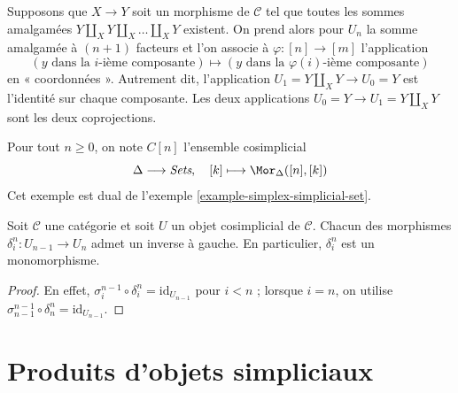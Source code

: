 \begin{example}
\label{example-push-outs-simplicial-object}
Supposons que $X\to Y$ soit un morphisme de $\mathcal{C}$ tel que toutes les
sommes amalgamées $Y\amalg_X Y \amalg_X \ldots \amalg_X Y$ existent.
On prend alors pour $U_n$ la somme amalgamée à $(n + 1)$ facteurs et
l'on associe à $\varphi : [n] \to [m]$ l'application
$$
(y \text{ dans la }i\text{-ième composante})
\mapsto
(y \text{ dans la }\varphi(i)\text{-ième composante})
$$
en « coordonnées ». Autrement dit, l'application
$U_1 = Y \amalg_X Y \to U_0 = Y$ est l'identité sur chaque composante.
Les deux applications $U_0 = Y \to U_1 = Y \amalg_X Y$ sont les deux
coprojections.
\end{example}

\begin{example}
\label{example-simplex-cosimplicial-set}
Pour tout $n \geq 0$, on note $C[n]$ l'ensemble cosimplicial
$$
\Delta \longrightarrow \textit{Sets},\quad
[k] \longmapsto \Mor_{\Delta}([n], [k])
$$
Cet exemple est dual de l'exemple \ref{example-simplex-simplicial-set}.
\end{example}

\begin{lemma}
\label{lemma-di-injective}
Soit $\mathcal{C}$ une catégorie et soit $U$ un objet cosimplicial de
$\mathcal{C}$. Chacun des morphismes $\delta^n_i : U_{n - 1} \to U_n$
admet un inverse à gauche. En particulier, $\delta^n_i$ est un
monomorphisme.
\end{lemma}

\begin{proof}
En effet,
$\sigma_i^{n - 1} \circ \delta^n_i = \text{id}_{U_{n - 1}}$
pour $i < n$ ; lorsque $i = n$, on utilise
$\sigma_{n - 1}^{n - 1} \circ \delta^n_n = \text{id}_{U_{n - 1}}$.
\end{proof}


























\section{Produits d'objets simpliciaux}
\label{section-products}

